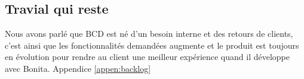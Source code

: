 \subsection{Travial qui reste}
Nous avons parlé que BCD est né d'un besoin interne et des retours de clients, c'est ainsi que les fonctionnalités demandées augmente et le produit est toujours en évolution pour rendre au client une meilleur expérience quand il développe avec Bonita. Appendice \ref{appen:backlog}
